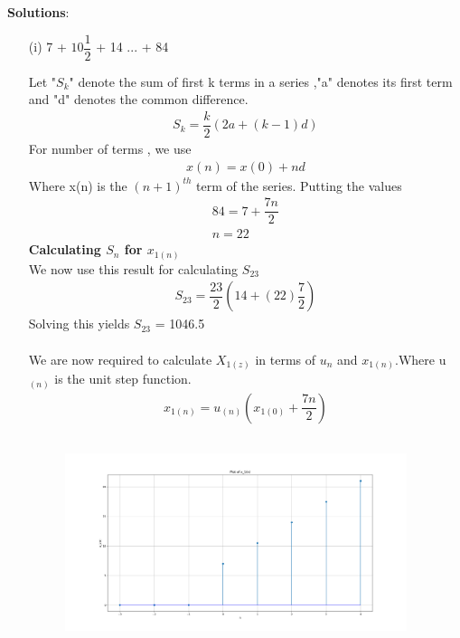 \documentclass[journal,12pt,twocolumn]{IEEEtran}
\theoremstyle{remark}
\begin{document}
\vspace{0.5cm}
\textbf{Solutions}:
\begin{enumerate}
\item[(i)]   
7 + $10\dfrac{1}{2}$ + 14 ... + 84\\
\vspace{0.2cm}

Let "$S_{k}$" denote the sum of first k terms in a series ,"a" denotes its first term and "d" denotes the common difference.
\begin{align}
{S_k} = \dfrac{k}{2}(2a + (k-1)d)\label{eq:1}
\end{align}
For number of terms , we use
\begin{align}
x(n) = x(0) + nd\label{eq:2}
\end{align}
Where x(n) is the $(n+1)^{th}$ term of the series. Putting the values
\begin{align}  
84 = 7+\dfrac{7n}{2}\\
n=22
\end{align}
\textbf{Calculating $S_n$ for $x_{1(n)}$ }\\
We now use this result for calculating $S_{23}$
\begin{align}
    S_{23} = \dfrac{23}{2}(14+(22)\dfrac{7}{2})
    \end{align}
Solving this yields $S_{23}$ = 1046.5\\\\
We are now required to calculate $X_{1(z)}$ in terms of $u_n$ and $x_{1(n)}$.Where u$_{(n)}$ is the unit step function.
\begin{align}
    x_{1(n)} = u_{(n)}(x_{1(0)}+\dfrac{7n}{2})
    \end{align}
    \begin{figure}[!ht]
    \centering
\graphicspath{ {figs/} }
\includegraphics[width=10cm, height=6cm]{graph_1}
\end{figure}
\\\\\\\\

\end{enumerate}
\end{document}
